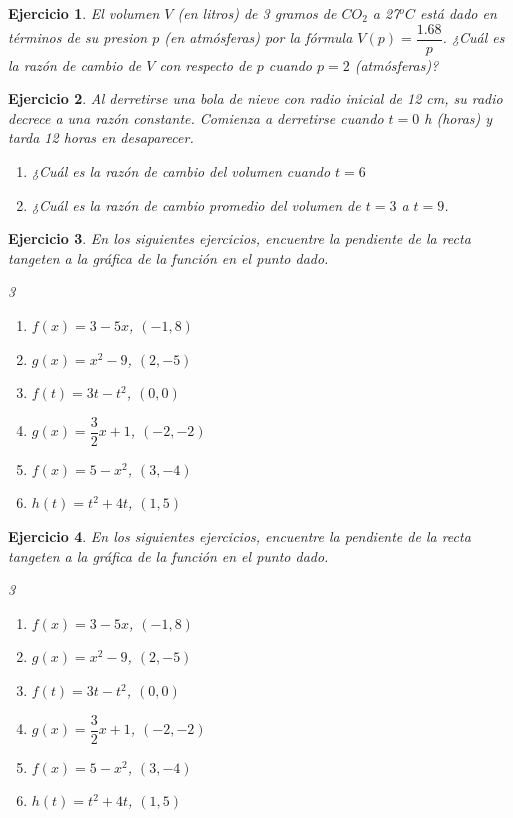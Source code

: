 \documentclass[12pt,tikz,border=5pt]{article}
\newtheorem{ejercicio}{Ejercicio}[section]
\begin{document}
\begin{ejercicio}
  El volumen $V$ (en litros) de 3 gramos de $CO_2$ a 27$^oC$ está dado en términos de su presion $p$ (en atmósferas) por la fórmula $V(p) = \dfrac{1.68}{p}$. ¿Cuál es la razón de cambio de $V$ con respecto de $p$ cuando $p = 2$ (atmósferas)?
\end{ejercicio}

\begin{ejercicio}
  Al derretirse una bola de nieve con radio inicial de 12 cm, su radio decrece a una razón constante. Comienza a derretirse cuando $t = 0$ h (horas) y tarda 12 horas en desaparecer.
  \begin{enumerate}[label=(\alph*)]
    \item ¿Cuál es la razón de cambio del volumen cuando $t = 6$
    \item ¿Cuál es la razón de cambio promedio del volumen de $t = 3$ a $t = 9$.
  \end{enumerate}
\end{ejercicio}

\begin{ejercicio}
  En los siguientes ejercicios, encuentre la pendiente de la recta tangeten a la gráfica de la función en el punto dado.
  \begin{multicols}{3}
    \begin{enumerate}[label=(\alph*)]
      \item $f(x) = 3 - 5x$, $(-1, 8)$
      \item $g(x) = x^2 - 9$, $(2, -5)$
      \item $f(t) = 3t - t^2$, $(0, 0)$
      \item $g(x) = \dfrac{3}{2}x + 1$, $(-2, -2)$
      \item $f(x) = 5 - x^2$, $(3, -4)$
      \item $h(t) = t^2 + 4t$, $(1, 5)$
    \end{enumerate}
  \end{multicols}
\end{ejercicio}

\begin{ejercicio}
  En los siguientes ejercicios, encuentre la pendiente de la recta tangeten a la gráfica de la función en el punto dado.
  \begin{multicols}{3}
    \begin{enumerate}[label=(\alph*)]
      \item $f(x) = 3 - 5x$, $(-1, 8)$
      \item $g(x) = x^2 - 9$, $(2, -5)$
      \item $f(t) = 3t - t^2$, $(0, 0)$
      \item $g(x) = \dfrac{3}{2}x + 1$, $(-2, -2)$
      \item $f(x) = 5 - x^2$, $(3, -4)$
      \item $h(t) = t^2 + 4t$, $(1, 5)$
    \end{enumerate}
  \end{multicols}
\end{ejercicio}



\end{document}
